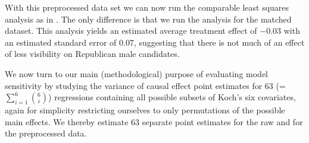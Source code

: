 \documentclass[11pt,titlepage]{article}
\begin{document}
With this preprocessed data set we can now run the comparable least
squares analysis as in \citet{Koch02}.  The only difference is that we
run the analysis for the matched dataset.  This analysis yields an
estimated average treatment effect of $-0.03$ with an estimated
standard error of $0.07$, suggesting that there is not much of an
effect of less visibility on Republican male candidates.

We now turn to our main (methodological) purpose of evaluating model
sensitivity by studying the variance of causal effect point estimates
for 63 (=$\sum_{i=1}^6 {6 \choose i}$) regressions containing all
possible subsets of Koch's six covariates, again for simplicity
restricting ourselves to only permutations of the possible main
effects.  We thereby estimate 63 separate point estimates for the raw
and for the preprocessed data.
\end{document}
